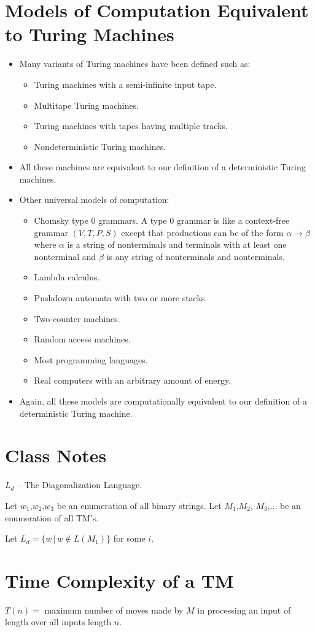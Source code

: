 \documentclass[]{article}
\begin{document}
\section{Models of Computation Equivalent to Turing Machines}
  \begin{itemize}
    \item Many variants of Turing machines have been defined such as:
      \begin{itemize}
        \item Turing machines with a semi-infinite input tape.
        \item Multitape Turing machines.
        \item Turing machines with tapes having multiple tracks.
        \item Nondeterministic Turing machines.
      \end{itemize}
    \item All these machines are equivalent to our definition of a 
    deterministic Turing machines.
    \item Other universal models of computation:
      \begin{itemize}
        \item Chomsky type 0 grammars. A type 0 grammar is like a context-free 
        grammar $(V, T, P, S)$ except that productions can be of the form
        $\alpha \rightarrow \beta$ where $\alpha$ is a string of nonterminals 
        and terminals with at least one nonterminal and $\beta$ is any string 
        of nonterminals and nonterminals.
        \item Lambda calculus.
        \item Pushdown automata with two or more stacks.
        \item Two-counter machines.
        \item Random access machines.
        \item Most programming languages.
        \item Real computers with an arbitrary amount of energy.
      \end{itemize}
    \item Again, all these models are computationally equivalent to our 
    definition of a deterministic Turing machine.
  \end{itemize}

\section*{Class Notes}
  $L_d$ -- The Diagonalization Language.
  
  Let $w_1$,$w_2$,$w_3$ be an enumeration of all binary strings. Let $M_1$,$M_2$,
  $M_3$,$\ldots$ be an enumeration of all TM's.
  
  Let $L_d = \{w \, | \, w \notin L(M_1) \}$ for some $i$.

\section*{Time Complexity of a TM}
  $T(n) =$ maximum number of moves made by $M$ in processing an input of length over all inputs length $n$.
  
\end{document}
